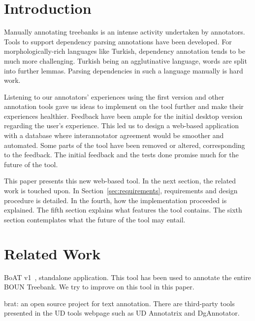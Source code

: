\documentclass[
]{ceurart}
\begin{document}
\maketitle

\section{Introduction}

Manually annotating treebanks is an intense activity undertaken by annotators.
Tools to support dependency parsing annotations have been developed. %
For morphologically-rich languages like Turkish, dependency annotation tends to be much more challenging.
Turkish being an agglutinative language, words are split into further lemmas.
Parsing dependencies in such a language manually is hard work.

Listening to our annotators' experiences using the first version and other annotation tools gave us ideas to implement on the tool further and make their experiences healthier.
Feedback have been ample for the initial desktop version regarding the user's experience.
This led us to design a web-based application with a database where interannotator agreement would be smoother and automated.
Some parts of the tool have been removed or altered, corresponding to the feedback.
The initial feedback and the tests done promise much for the future of the tool.

This paper presents this new web-based tool.
In the next section, the related work is touched upon.
In Section~\ref{sec:requirements}, requirements and design procedure is detailed.
In the fourth, how the implementation proceeded is explained.
The fifth section explains what features the tool contains.
The sixth section contemplates what the future of the tool may entail.

\section{Related Work}
\label{sec:related}

BoAT v1~\cite{turk-etal-2019-turkish}, standalone application.
This tool has been used to annotate the entire BOUN Treebank.
We try to improve on this tool in this paper.

brat: an open source project for text annotation.\cite{brat}
There are third-party tools presented in the UD tools webpage such as UD Annotatrix\cite{tyers-etal:2018} and DgAnnotator\cite{dgannotator}.
\end{document}
